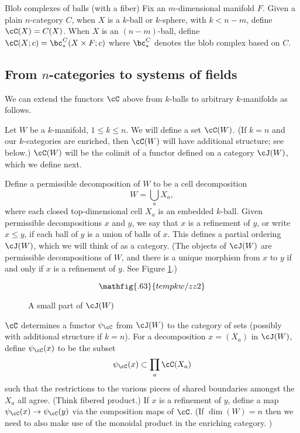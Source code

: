 \begin{example}{Blob complexes of balls (with a fiber)}
Fix an $m$-dimensional manifold $F$.
Given a plain $n$-category $C$, 
when $X$ is a $k$-ball or $k$-sphere, with $k<n-m$, define $\cC(X) = C(X)$. When $X$ is an $(n-m)$-ball,
define $\cC(X; c) = \bc^C_*(X\times F; c)$
where $\bc^C_*$ denotes the blob complex based on $C$.
\end{example}

\begin{defn}
\end{defn}






\subsection{From $n$-categories to systems of fields}
\label{ss:ncat_fields}

We can extend the functors $\cC$ above from $k$-balls to arbitrary $k$-manifolds as follows.

Let $W$ be a $k$-manifold, $1\le k \le n$.
We will define a set $\cC(W)$.
(If $k = n$ and our $k$-categories are enriched, then
$\cC(W)$ will have additional structure; see below.)
$\cC(W)$ will be the colimit of a functor defined on a category $\cJ(W)$,
which we define next.

Define a permissible decomposition of $W$ to be a cell decomposition
\[
	W = \bigcup_a X_a ,
\]
where each closed top-dimensional cell $X_a$ is an embedded $k$-ball.
Given permissible decompositions $x$ and $y$, we say that $x$ is a refinement
of $y$, or write $x \le y$, if each ball of $y$ is a union of balls of $x$.
This defines a partial ordering $\cJ(W)$, which we will think of as a category.
(The objects of $\cJ(W)$ are permissible decompositions of $W$, and there is a unique
morphism from $x$ to $y$ if and only if $x$ is a refinement of $y$.
See Figure \ref{partofJfig}.)

\begin{figure}[!ht]
\begin{equation*}
\mathfig{.63}{tempkw/zz2}
\end{equation*}
\caption{A small part of $\cJ(W)$}
\label{partofJfig}
\end{figure}


$\cC$ determines 
a functor $\psi_\cC$ from $\cJ(W)$ to the category of sets 
(possibly with additional structure if $k=n$).
For a decomposition $x = (X_a)$ in $\cJ(W)$, define $\psi_\cC(x)$ to be the subset
\[
	\psi_\cC(x) \sub \prod_a \cC(X_a)
\]
such that the restrictions to the various pieces of shared boundaries amongst the
$X_a$ all agree.
(Think fibered product.)
If $x$ is a refinement of $y$, define a map $\psi_\cC(x)\to\psi_\cC(y)$
via the composition maps of $\cC$.
(If $\dim(W) = n$ then we need to also make use of the monoidal
product in the enriching category.
)


